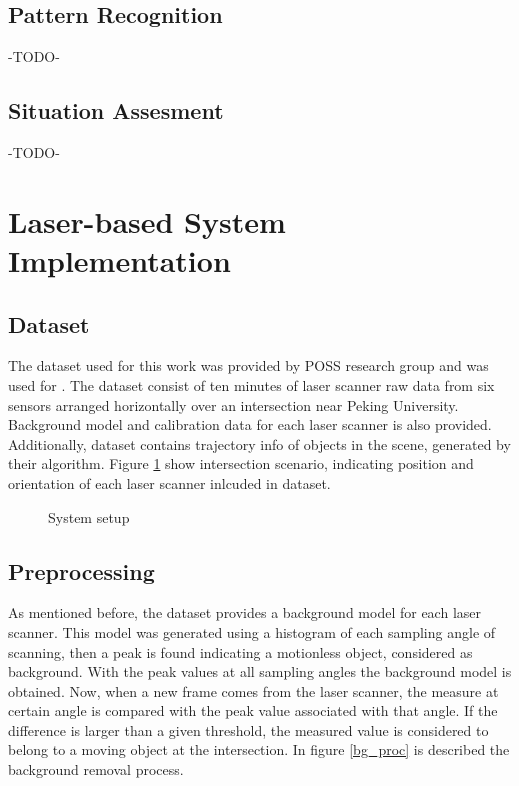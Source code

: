 \documentclass[10pt,twocolumn,letterpaper]{article}
\begin{document}
\subsection{Pattern Recognition}

-TODO-

\subsection{Situation Assesment}

-TODO-

\section{Laser-based System Implementation}

\subsection{Dataset}
 The dataset used for this work was provided by POSS research group and was used for \cite{Zhao2009}. The dataset consist of ten minutes of laser scanner raw data from six sensors arranged horizontally over an intersection near Peking University. Background model and calibration data for each laser scanner is also provided. Additionally, dataset contains trajectory info of objects in the scene, generated by their algorithm. Figure \ref{inter_cfg} show intersection scenario, indicating position and orientation of each laser scanner inlcuded in dataset.
 
\begin{figure}[ht!]
\centering


\caption{System setup}
\label{inter_cfg}
\end{figure}
 
\subsection{Preprocessing}

As mentioned before, the dataset provides a background model for each laser scanner. This model was generated using a histogram of each sampling angle of scanning, then a peak is found indicating a motionless object, considered as background. With the peak values at all sampling angles the background model is obtained. Now, when a new frame comes from the laser scanner, the measure at certain angle is compared with the peak value associated with that angle. If the difference is larger than a given threshold, the measured value is considered to belong to a moving object at the intersection. In figure \ref{bg_proc} is described the background removal process.
\end{document}
